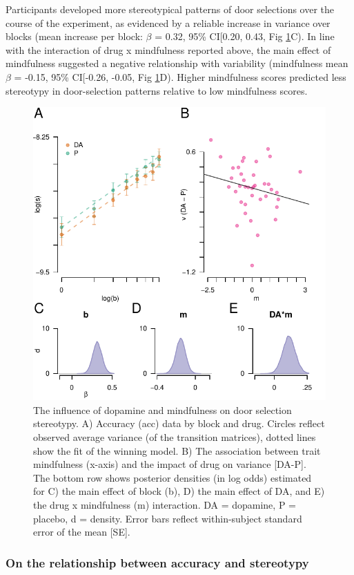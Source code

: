 \documentclass{article}
\begin{document}
Participants developed more stereotypical patterns of door selections
over the course of the experiment, as evidenced by a reliable increase
in variance over blocks (mean increase per block: \(\beta\) = 0.32, 95\%
CI{[}0.20, 0.43, Fig \ref{fig:stereofig}C). In line with the interaction
of drug x mindfulness reported above, the main effect of mindfulness
suggested a negative relationship with variability (mindfulness mean
\(\beta\) = -0.15, 95\% CI{[}-0.26, -0.05, Fig \ref{fig:stereofig}D).
Higher mindfulness scores predicted less stereotypy in door-selection
patterns relative to low mindfulness scores.

\begin{figure}

{\centering \includegraphics[width=0.7\linewidth]{../../images/s_fig} 

}

\caption{The influence of dopamine and mindfulness on door selection stereotypy. A) Accuracy (acc) data by block and drug. Circles reflect observed average variance (of the transition matrices), dotted lines show the fit of the winning model. B) The association between trait mindfulness (x-axis) and the impact of drug on variance [DA-P]. The bottom row shows posterior densities (in log odds) estimated for C) the main effect of block (b), D) the main effect of DA, and E) the drug x mindfulness (m) interaction. DA = dopamine, P = placebo, d = density. Error bars reflect within-subject standard error of the mean [SE].}\label{fig:stereofig}
\end{figure}

\hypertarget{on-the-relationship-between-accuracy-and-stereotypy}{%
\subsubsection{On the relationship between accuracy and
stereotypy}\label{on-the-relationship-between-accuracy-and-stereotypy}}
\end{document}
